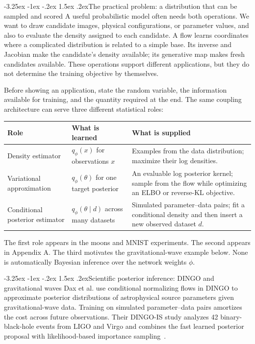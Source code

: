 \documentclass[11pt,a4paper]{article}
\makeatletter
\renewcommand\subsection{\@startsection{subsection}{2}{\z@}%
  {-3.25ex \@plus -1ex \@minus -.2ex}%
  {1.5ex \@plus .2ex}{\normalfont\large}}
\makeatother
\begin{document}
\subsection{The practical problem: a distribution that can be sampled and scored}
A useful probabilistic model often needs both operations. We want to draw
candidate images, physical configurations, or parameter values, and also to
evaluate the density assigned to each candidate. A flow learns coordinates
where a complicated distribution is related to a simple base. Its inverse
and Jacobian make the candidate's density available; its generative map makes
fresh candidates available. These operations support different applications,
but they do not determine the training objective by themselves.

Before showing an application, state the random variable, the information
available for training, and the quantity required at the end. The same
coupling architecture can serve three different statistical roles:
\begin{center}
\begin{tabular}{@{}p{34mm}p{57mm}p{66mm}@{}}
\toprule
Role & What is learned & What is supplied \\
\midrule
Density estimator & $q_\phi(x)$ for observations $x$ & Examples from the data
distribution; maximize their log densities. \\
Variational approximation & $q_\phi(\theta)$ for one target posterior & An
evaluable log posterior kernel; sample from the flow while optimizing an
ELBO or reverse-KL objective. \\
{\raggedright Conditional posterior estimator\par} & $q_\phi(\theta\mid d)$ across many datasets &
Simulated parameter--data pairs; fit a conditional density and then insert a
new observed dataset $d$. \\
\bottomrule
\end{tabular}
\end{center}
The first role appears in the moons and MNIST experiments. The second appears
in Appendix A. The third motivates the gravitational-wave example below.
None is automatically Bayesian inference over the network weights $\phi$.

\subsection{Scientific posterior inference: DINGO and gravitational waves}
Dax et al. use conditional normalizing flows in DINGO to approximate posterior
distributions of astrophysical source parameters given gravitational-wave
data. Training on simulated parameter--data pairs amortizes the cost across
future observations. Their DINGO-IS study analyzes 42 binary-black-hole events
from LIGO and Virgo and combines the fast learned posterior proposal with
likelihood-based importance sampling~\cite{dingo}.
\end{document}
